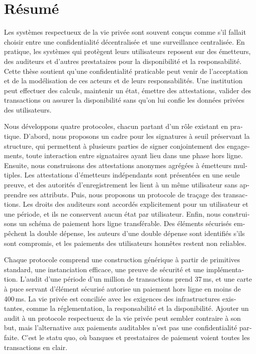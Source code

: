 \endgroup

\cleardoublepage%

\begingroup \let\clearpage\relax \let\cleardoublepage\relax
\let\cleardoublepage\relax

 \chapter*{Résumé}

\begin{otherlanguage}{french}
Les systèmes respectueux de la vie privée sont souvent conçus comme s'il
fallait choisir entre une confidentialité décentralisée et une surveillance
centralisée. En pratique, les systèmes qui protègent leurs utilisateurs reposent
sur des émetteurs, des auditeurs et d'autres prestataires pour la
disponibilité et la responsabilité. Cette thèse soutient qu'une confidentialité
praticable peut venir de l'acceptation et de la modélisation de ces acteurs
et de leurs responsabilités. Une institution peut effectuer des
calculs, maintenir un état, émettre des attestations, valider des transactions
ou assurer la disponibilité sans qu'on lui confie les données privées des
utilisateurs.

Nous développons quatre protocoles, chacun partant d'un rôle existant en
pratique. D'abord, nous proposons un cadre pour les signatures à seuil
préservant la structure, qui permettent à plusieurs parties de signer
conjointement des engagements, toute interaction entre signataires ayant
lieu dans une phase hors ligne. Ensuite, nous construisons des
attestations anonymes agrégées à émetteurs multiples. Les attestations
d'émetteurs indépendants sont présentées en une seule preuve, et des autorités
d'enregistrement les lient à un même utilisateur sans apprendre ses attributs.
Puis, nous proposons un protocole de traçage des transactions. Les
droits des auditeurs sont accordés explicitement pour un utilisateur et une
période, et ils ne conservent aucun état par utilisateur. Enfin,
nous construisons un schéma de paiement hors ligne transférable. Des éléments
sécurisés empêchent la double dépense, les auteurs d'une double dépense sont
identifiés s'ils sont compromis, et les paiements des utilisateurs honnêtes
restent non reliables.

Chaque protocole comprend une construction générique à partir de
primitives standard, une instanciation efficace, une preuve de sécurité et
une implémentation. L'audit d'une période d'un million de
transactions prend 37\,ms, et une carte à puce servant d'élément sécurisé
autorise un paiement hors ligne en moins de 400\,ms. La vie privée est
conciliée avec les exigences des infrastructures
existantes, comme la réglementation, la responsabilité et la disponibilité.
Ajouter un audit à un protocole respectueux de la vie privée peut sembler
contraire à son but, mais l'alternative aux paiements auditables n'est pas
une confidentialité parfaite. C'est le statu quo, où banques et
prestataires de paiement voient toutes les transactions en clair.
\end{otherlanguage}

\endgroup

\vfill
